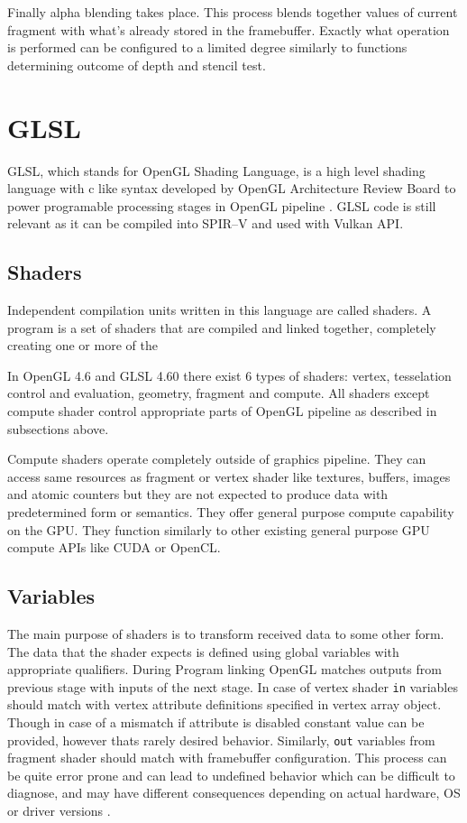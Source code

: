 Finally alpha blending takes place. This process blends together values of current fragment with what's already stored in the framebuffer.
Exactly what operation is performed can be configured to a limited degree similarly to functions determining outcome of depth and stencil test.

\section{GLSL}

GLSL, which stands for OpenGL Shading Language, is a high level shading language with c like syntax developed by OpenGL Architecture Review Board to power programable processing stages in OpenGL pipeline \cite{glslspec}.
GLSL code is still relevant as it can be compiled into SPIR--V and used with Vulkan API.

\subsection*{Shaders}

Independent compilation units written in this language are called shaders. A program is a set of
shaders that are compiled and linked together, completely creating one or more of the

In OpenGL 4.6 and GLSL 4.60 there exist 6 types of shaders: vertex, tesselation control and evaluation, geometry, fragment and compute.
All shaders except compute shader control appropriate parts of OpenGL pipeline as described in subsections above. 

Compute shaders operate completely outside of graphics pipeline. They can access same resources as fragment or vertex shader like textures, buffers, images and atomic counters
but they are not expected to produce data with predetermined form or semantics. They offer general purpose compute capability on the GPU. 
They function similarly to other existing general purpose GPU compute APIs like CUDA or OpenCL.

\subsection{Variables}

The main purpose of shaders is to transform received data to some other form. The data that the shader expects is defined using global variables with appropriate qualifiers.
During Program linking OpenGL matches outputs from previous stage with inputs of the next stage. 
In case of vertex shader \texttt{in} variables should match with vertex attribute definitions specified in vertex array object.
Though in case of a mismatch if attribute is disabled constant value can be provided, however thats rarely desired behavior.
Similarly, \texttt{out} variables from fragment shader should match with framebuffer configuration.
This process can be quite error prone and can lead to undefined behavior which can be difficult to diagnose, and may have different consequences depending on actual hardware, OS or driver versions
\cite{glslspec}.

